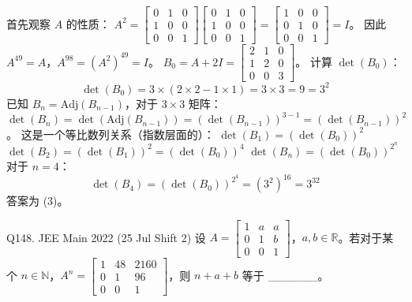 \begin{questions}
\begin{solution}
首先观察 $A$ 的性质：
$A^2 = \begin{bmatrix} 0 & 1 & 0 \\ 1 & 0 & 0 \\ 0 & 0 & 1 \end{bmatrix} \begin{bmatrix} 0 & 1 & 0 \\ 1 & 0 & 0 \\ 0 & 0 & 1 \end{bmatrix} = \begin{bmatrix} 1 & 0 & 0 \\ 0 & 1 & 0 \\ 0 & 0 & 1 \end{bmatrix} = I$。
因此 $A^{49} = A$，$A^{98} = (A^2)^{49} = I$。
$B_0 = A + 2I = \begin{bmatrix} 2 & 1 & 0 \\ 1 & 2 & 0 \\ 0 & 0 & 3 \end{bmatrix}$。
计算 $\det(B_0)$：
\[ \det(B_0) = 3 \times (2 \times 2 - 1 \times 1) = 3 \times 3 = 9 = 3^2 \]
已知 $B_n = \text{Adj}(B_{n-1})$，对于 $3 \times 3$ 矩阵：
$\det(B_n) = \det(\text{Adj}(B_{n-1})) = (\det(B_{n-1}))^{3-1} = (\det(B_{n-1}))^2$。
这是一个等比数列关系（指数层面的）：
$\det(B_1) = (\det(B_0))^2$
$\det(B_2) = (\det(B_1))^2 = (\det(B_0))^4$
$\det(B_n) = (\det(B_0))^{2^n}$
对于 $n=4$：
\[ \det(B_4) = (\det(B_0))^{2^4} = (3^2)^{16} = 3^{32} \]
答案为 (3)。
\end{solution}

\question
Q148. JEE Main 2022 (25 Jul Shift 2)
设 $A = \begin{bmatrix} 1 & a & a \\ 0 & 1 & b \\ 0 & 0 & 1 \end{bmatrix}$，$a, b \in \mathbb{R}$。若对于某个 $n \in \mathbb{N}$，$A^n = \begin{bmatrix} 1 & 48 & 2160 \\ 0 & 1 & 96 \\ 0 & 0 & 1 \end{bmatrix}$，则 $n + a + b$ 等于 \_\_\_\_\_\_。


\end{questions}
